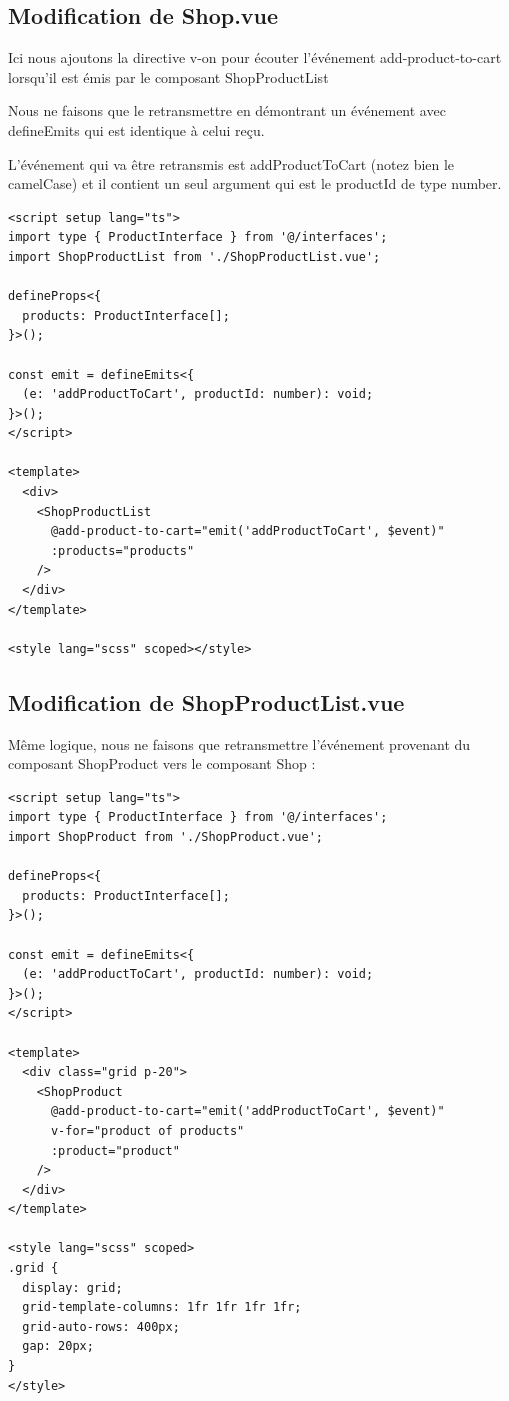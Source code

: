 \subsection{Modification de {\color{monOrange}Shop.vue}}
Ici nous ajoutons la directive {\color{monOrange}v-on} pour écouter l'événement {\color{monOrange}add-product-to-cart} lorsqu'il est émis par le composant {\color{monOrange}ShopProductList}

Nous ne faisons que le retransmettre en démontrant un événement avec {\color{monOrange}defineEmits} qui est identique à celui reçu.

L'événement qui va être retransmis est {\color{monOrange}addProductToCart} (notez bien le {\color{monOrange}camelCase}) et il contient un seul argument qui est le {\color{monOrange}productId} de type {\color{monOrange}number}.
\begin{verbatim}
<script setup lang="ts">
import type { ProductInterface } from '@/interfaces';
import ShopProductList from './ShopProductList.vue';

defineProps<{
  products: ProductInterface[];
}>();

const emit = defineEmits<{
  (e: 'addProductToCart', productId: number): void;
}>();
</script>

<template>
  <div>
    <ShopProductList
      @add-product-to-cart="emit('addProductToCart', $event)"
      :products="products"
    />
  </div>
</template>

<style lang="scss" scoped></style>
\end{verbatim}
\subsection{Modification de {\color{monOrange}ShopProductList.vue}}
Même logique, nous ne faisons que retransmettre l'événement provenant du composant {\color{monOrange}ShopProduct} vers le composant {\color{monOrange}Shop} :
\begin{verbatim}
<script setup lang="ts">
import type { ProductInterface } from '@/interfaces';
import ShopProduct from './ShopProduct.vue';

defineProps<{
  products: ProductInterface[];
}>();

const emit = defineEmits<{
  (e: 'addProductToCart', productId: number): void;
}>();
</script>

<template>
  <div class="grid p-20">
    <ShopProduct
      @add-product-to-cart="emit('addProductToCart', $event)"
      v-for="product of products"
      :product="product"
    />
  </div>
</template>

<style lang="scss" scoped>
.grid {
  display: grid;
  grid-template-columns: 1fr 1fr 1fr 1fr;
  grid-auto-rows: 400px;
  gap: 20px;
}
</style>
\end{verbatim}
